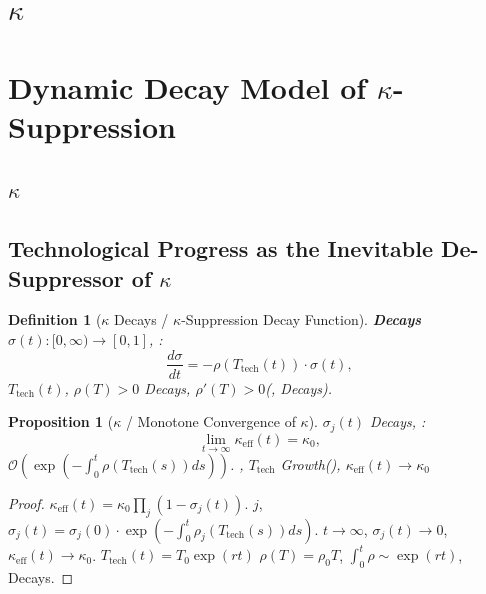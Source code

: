 \documentclass[11pt,a4paper]{article}
\newtheorem{proposition}[theorem]{Proposition}
\newtheorem{definition}[theorem]{Definition}
\theoremstyle{definition}
\newcommand{\coupling}{\kappa}
\newcommand{\suppress}{\sigma}
\newcommand{\calO}{\mathcal{O}}
\begin{document}
\section{$\coupling$}
\section{Dynamic Decay Model of $\coupling$-Suppression}
\label{sec:dynamics}
\subsection{ $\coupling$}
\subsection{Technological Progress as the Inevitable De-Suppressor of $\coupling$}
\begin{definition}[$\coupling$ Decays / $\coupling$-Suppression Decay Function]
\label{def:decay}
\textbf{Decays} $\suppress(t): [0, \infty) \to [0,1]$, : 
\[
\frac{d\suppress}{dt} = -\rho(T_{\text{tech}}(t)) \cdot \suppress(t),
\]
 $T_{\text{tech}}(t)$, $\rho(T) > 0$ Decays, 
 $\rho'(T) > 0$(, Decays).
\end{definition}
\begin{proposition}[$\coupling$ / Monotone Convergence of $\coupling$]
\label{prop:monotone}
 $\suppress_j(t)$ Decays, : 
\[
\lim_{t \to \infty} \coupling_{\text{eff}}(t) = \coupling_0,
\]
 $\calO(\exp(-\int_0^t \rho(T_{\text{tech}}(s)) ds))$.
, $T_{\text{tech}}$ Growth(), $\coupling_{\text{eff}}(t) \to \coupling_0$
\end{proposition}
\begin{proof}
 $\coupling_{\text{eff}}(t) = \coupling_0 \prod_j (1 - \suppress_j(t))$.
 $j$, $\suppress_j(t) = \suppress_j(0) \cdot \exp(-\int_0^t \rho_j(T_{\text{tech}}(s)) ds)$.
 $t \to \infty$, $\suppress_j(t) \to 0$, $\coupling_{\text{eff}}(t) \to \coupling_0$.
 $T_{\text{tech}}(t) = T_0 \exp(rt)$ $\rho(T) = \rho_0 T$, 
 $\int_0^t \rho \sim \exp(rt)$, Decays.
\end{proof}
\end{document}
